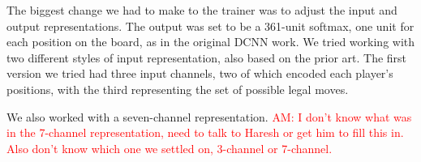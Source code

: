 The biggest change we had to make to the trainer was to adjust the input and output representations. The output was set to be a 361-unit softmax, one unit for each position on the board, as in the original DCNN work. We tried working with two different styles of input representation, also based on the prior art. The first version we tried had three input channels, two of which encoded each player's positions, with the third representing the set of possible legal moves.

We also worked with a seven-channel representation. \textcolor{red}{AM: I don't know what was in the 7-channel representation, need to talk to Haresh or get him to fill this in. Also don't know which one we settled on, 3-channel or 7-channel.}